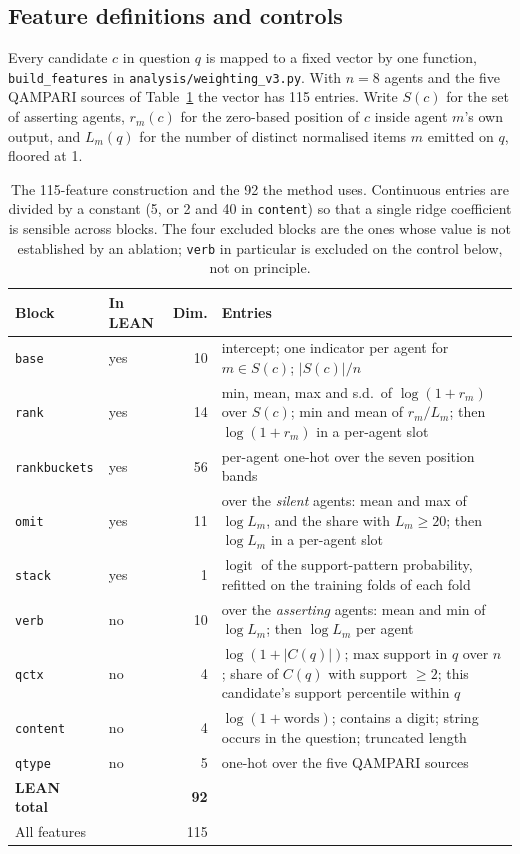 \documentclass{article}
\begin{document}
\subsection{Feature definitions and controls}
\label{app:features}

Every candidate $c$ in question $q$ is mapped to a fixed vector by one function, \texttt{build\_features} in \texttt{analysis/weighting\_v3.py}. With $n=8$ agents and the five QAMPARI sources of Table~\ref{tab:blocks} the vector has 115 entries. Write $S(c)$ for the set of asserting agents, $r_m(c)$ for the zero-based position of $c$ inside agent $m$'s own output, and $L_m(q)$ for the number of distinct normalised items $m$ emitted on $q$, floored at 1.

\begin{table}
  \caption{The 115-feature construction and the 92 the method uses. Continuous entries are divided by a constant (5, or 2 and 40 in \texttt{content}) so that a single ridge coefficient is sensible across blocks. The four excluded blocks are the ones whose value is not established by an ablation; \texttt{verb} in particular is excluded on the control below, not on principle.}
  \label{tab:blocks}
  \centering
  \begin{tabular}{llrp{6.1cm}}
    \toprule
    Block & In LEAN & Dim. & Entries \\
    \midrule
    \texttt{base}        & yes & 10 & intercept; one indicator per agent for $m \in S(c)$; $|S(c)|/n$ \\
    \texttt{rank}        & yes & 14 & min, mean, max and s.d.\ of $\log(1+r_m)$ over $S(c)$; min and mean of $r_m/L_m$; then $\log(1+r_m)$ in a per-agent slot \\
    \texttt{rankbuckets} & yes & 56 & per-agent one-hot over the seven position bands \\
    \texttt{omit}        & yes & 11 & over the \emph{silent} agents: mean and max of $\log L_m$, and the share with $L_m \geq 20$; then $\log L_m$ in a per-agent slot \\
    \texttt{stack}       & yes &  1 & $\operatorname{logit}$ of the support-pattern probability, refitted on the training folds of each fold \\
    \midrule
    \texttt{verb}        & no  & 10 & over the \emph{asserting} agents: mean and min of $\log L_m$; then $\log L_m$ per agent \\
    \texttt{qctx}        & no  &  4 & $\log(1+|C(q)|)$; max support in $q$ over $n$; share of $C(q)$ with support $\geq 2$; this candidate's support percentile within $q$ \\
    \texttt{content}     & no  &  4 & $\log(1+\text{words})$; contains a digit; string occurs in the question; truncated length \\
    \texttt{qtype}       & no  &  5 & one-hot over the five QAMPARI sources \\
    \midrule
    \textbf{LEAN total}  &     & \textbf{92} & \\
    All features         &     & 115 & \\
    \bottomrule
  \end{tabular}
\end{table}
\end{document}
